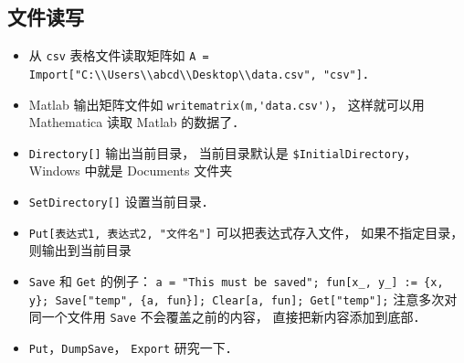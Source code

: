 \subsection{文件读写}
\begin{itemize}
\item 从 \verb|csv| 表格文件读取矩阵如 \verb|A = Import["C:\\Users\\abcd\\Desktop\\data.csv", "csv"]|．
\item Matlab 输出矩阵文件如 \verb|writematrix(m,'data.csv')|， 这样就可以用 Mathematica 读取 Matlab 的数据了．
\item \verb|Directory[]| 输出当前目录， 当前目录默认是 \verb|$InitialDirectory|， Windows 中就是 Documents 文件夹
\item \verb|SetDirectory[]| 设置当前目录．
\item \verb|Put[表达式1, 表达式2, "文件名"]| 可以把表达式存入文件， 如果不指定目录， 则输出到当前目录
\item \verb|Save| 和 \verb|Get| 的例子： \verb|a = "This must be saved"; fun[x_, y_] := {x, y}; Save["temp", {a, fun}]; Clear[a, fun]; Get["temp"];| 注意多次对同一个文件用 \verb|Save| 不会覆盖之前的内容， 直接把新内容添加到底部．
\item \verb|Put|，\verb|DumpSave|， \verb|Export| 研究一下．
\end{itemize}
